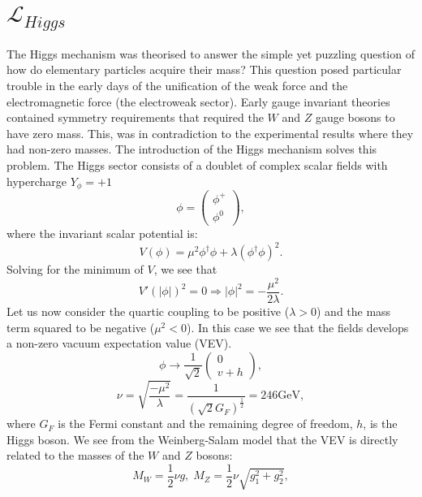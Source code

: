 \section{${\mathcal{L}_{Higgs}}$}
The Higgs mechanism \cite{higgs-mech-p1,higg-mech-p2,higgs-mech-p3} was theorised to answer the simple yet puzzling question of how do elementary particles acquire their mass? This question posed particular trouble in the early days of the unification of the weak force and the electromagnetic force (the electroweak sector). Early gauge invariant theories contained symmetry requirements that required the $W$ and $Z$ gauge bosons to have zero mass. This, was in contradiction to the experimental results where they had non-zero masses. The introduction of the Higgs mechanism solves this problem. The Higgs sector consists of a doublet of complex scalar fields with hypercharge $Y_\phi=+1$
\begin{equation}
    \phi= \begin{pmatrix}\phi^+ \\ \phi^0 
    \end{pmatrix},
\end{equation}
where the invariant scalar potential is:
\begin{equation}
    V(\phi)=\mu^2 \phi^\dagger\phi + \lambda(\phi^\dagger\phi)^2.
\end{equation}
Solving for the minimum of $V$, we see that
\begin{equation}
    V'(|\phi|)^2=0 \Rightarrow |\phi|^2 =-\frac{\mu^2}{2\lambda}.
\end{equation}
Let us now consider the quartic coupling to be positive ($\lambda>0$) and the mass term squared to be negative ($\mu^2<0$). In this case we see that the fields develops a non-zero vacuum expectation value (VEV).
\begin{equation*}
    \phi \rightarrow \frac{1}{\sqrt{2}}\begin{pmatrix} 0\\ v+h \end{pmatrix},
\end{equation*}
\begin{equation}
    \nu=\sqrt{\frac{-\mu^2}{\lambda}}=\frac{1}{(\sqrt{2}G_F)^{\frac{1}{2}}}= 246 \text{GeV},
\end{equation}
where $G_F$ is the Fermi constant and the remaining degree of freedom, $h$, is the Higgs boson. We see from the Weinberg-Salam model \cite{BILENKY198273} that the VEV is directly related to the masses of the $W$ and $Z$ bosons: 
\begin{equation}
    M_W=\frac{1}{2} \nu g, \; M_Z=\frac{1}{2}\nu \sqrt{g_1^2+g_2^2},
\end{equation}

